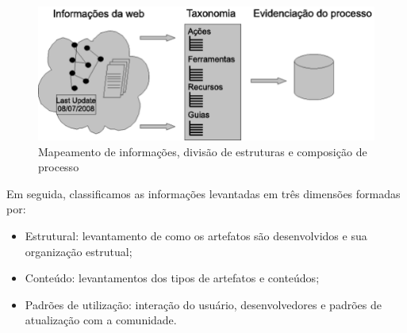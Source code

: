 \begin{figure}[h]
 \centering
 \includegraphics{../../doc/diagramas/maping.eps}
 \caption[Mapeamento de informações]{Mapeamento de informações, divisão de estruturas e composição de processo \cite{refframework}}
 \label{fig:mapping}
\end{figure}

% 

% 

Em seguida, classificamos as informações levantadas em três dimensões formadas por:
\begin{itemize}
 \item Estrutural: levantamento de como os artefatos são desenvolvidos e sua organização estrutual;
 \item Conteúdo: levantamentos dos tipos de artefatos e conteúdos;
 \item Padrões de utilização: interação do usuário, desenvolvedores e padrões de atualização com a comunidade.
 \end{itemize}

